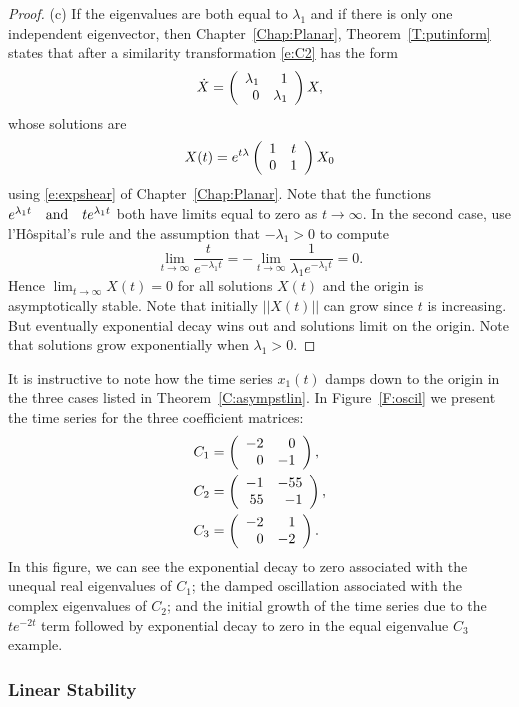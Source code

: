 \documentclass{ximera}
\begin{document}
\begin{proof}
\noindent (c) \quad If the eigenvalues are both equal to $\lambda_1$
and if there is only one independent eigenvector, then
Chapter~\ref{Chap:Planar}, Theorem~\ref{T:putinform} states that after a
similarity transformation \eqref{e:C2} has the form
\[
\dot{X} = \left(\begin{array}{rr} \lambda_1 & 1\\ 0 &\lambda_1\end{array}\right)X,
\]
whose solutions are
\[
X(t) = e^{t\lambda}\left(\begin{array}{cc} 1 & t\\ 0 &1\end{array}\right) X_0
\]
using \eqref{e:expshear} of Chapter~\ref{Chap:Planar}. Note that the functions
$e^{\lambda_1 t} \quad\mbox{and}\quad te^{\lambda_1 t}$ both have limits equal to zero as
$t\to\infty$.  In the second case, use l'H\^{o}spital's rule and the
assumption that $-\lambda_1>0$ to compute
\[
\lim_{t\to\infty} \frac{t}{e^{-\lambda_1 t}} =
  -\lim_{t\to\infty} \frac{1}{\lambda_1 e^{-\lambda_1 t}} = 0.
\]
Hence $\lim_{t\to\infty} X(t) =0$ for all solutions $X(t)$ and the origin
is asymptotically stable.  Note that initially $||X(t)||$ can grow since
$t$ is increasing.  But eventually exponential decay wins out and solutions
limit on the origin.   Note that solutions grow exponentially when
$\lambda_1>0$.  \end{proof}

It is instructive to note how the time series $x_1(t)$ damps down to the
origin in the three cases listed in Theorem~\ref{C:asympstlin}.
In Figure~\ref{F:oscil} we present the time series for the three
coefficient matrices:
\begin{align*}
C_1 &= \left(\begin{array}{rr} -2 & 0\\ 0 &-1\end{array}\right), \\
C_2 &= \left(\begin{array}{rr} -1 & -55\\ 55 &-1\end{array}\right), \\
C_3 &= \left(\begin{array}{rr} -2 & 1\\ 0 &-2\end{array}\right).
\end{align*}
In this figure, we can see the exponential decay to zero associated with the
unequal real eigenvalues of $C_1$; the damped oscillation associated with the
complex eigenvalues of $C_2$; and the initial growth of the time series due
to the $te^{-2t}$ term followed by exponential decay to zero in the equal
eigenvalue $C_3$ example.

\begin{figure*}[htb]
           \centerline{%
	   }
           \caption{Time series for different sinks.}
           \label{F:oscil}
\end{figure*}


\subsubsection*{Linear Stability}
\end{document}
